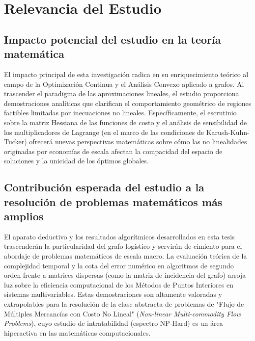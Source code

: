 \section{Relevancia del Estudio}

\subsection{Impacto potencial del estudio en la teoría matemática}
El impacto principal de esta investigación radica en su enriquecimiento teórico al campo de la Optimización Continua y el Análisis Convexo aplicado a grafos. Al trascender el paradigma de las aproximaciones lineales, el estudio proporciona demostraciones analíticas que clarifican el comportamiento geométrico de regiones factibles limitadas por inecuaciones no lineales. Específicamente, el escrutinio sobre la matriz Hessiana de las funciones de costo y el análisis de sensibilidad de los multiplicadores de Lagrange (en el marco de las condiciones de Karush-Kuhn-Tucker) ofrecerá nuevas perspectivas matemáticas sobre cómo las no linealidades originadas por economías de escala afectan la compacidad del espacio de soluciones y la unicidad de los óptimos globales.

\subsection{Contribución esperada del estudio a la resolución de problemas matemáticos más amplios}
El aparato deductivo y los resultados algorítmicos desarrollados en esta tesis trascenderán la particularidad del grafo logístico y servirán de cimiento para el abordaje de problemas matemáticos de escala macro. La evaluación teórica de la complejidad temporal y la cota del error numérico en algoritmos de segundo orden frente a matrices dispersas (como la matriz de incidencia del grafo) arroja luz sobre la eficiencia computacional de los Métodos de Puntos Interiores en sistemas multivariables. Estas demostraciones son altamente valoradas y extrapolables para la resolución de la clase abstracta de problemas de "Flujo de Múltiples Mercancías con Costo No Lineal" (\textit{Non-linear Multi-commodity Flow Problems}), cuyo estudio de intratabilidad (espectro NP-Hard) es un área hiperactiva en las matemáticas computacionales.

